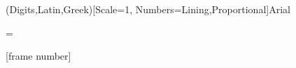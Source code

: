 


\usepackage{scrextend}
\usepackage[no-math]{fontspec} %
\usepackage{mathspec}
\usepackage{xunicode,xltxtra} %
\usepackage{mathptmx}
\usepackage{multicol}

\usepackage{polyglossia} %
\setmainlanguage{ukrainian}
\newfontfamily{}
\newfontfamily{}

\setsansfont{Arial}
\setmainfont[Scale=1]{Arial} %
\setmathfont(Digits,Latin,Greek)[Scale=1, Numbers={Lining,Proportional}]{Arial}
\setmonofont{Arial}

\emergencystretch=\maxdimen
{}




\graphicspath{{./figures/}}

[frame number]


\makeatletter
\def\beamer@framenotesbegin{%
  \ifnum \value{framenumber}>1
  \frametitle{\small\bf\insertsectionhead}
  \framesubtitle{\small\bf\insertsubsectionhead}
  \else
  \fi
}
\makeatother


